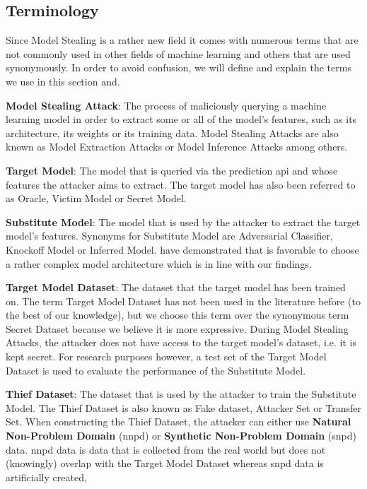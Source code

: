 \subsection{Terminology}
\label{sec:ModelStealing:Terminology}
Since Model Stealing is a rather new field it comes with numerous terms that are not commonly used in other fields of machine learning and others that are used 
synonymously. In order to avoid confusion, we will define and explain the terms we use in this section and. \par
\textbf{Model Stealing Attack}: The process of maliciously querying a machine learning model in order to extract some or all of the model's features, such as its
architecture, its weights or its training data. Model Stealing Attacks are also known as Model Extraction Attacks or Model Inference Attacks among others. \par
\textbf{Target Model}: The model that is queried via the prediction \gls{api} and whose features the attacker aims to extract. The target model has also been referred to 
as Oracle, Victim Model or Secret Model. \par
\textbf{Substitute Model}: The model that is used by the attacker to extract the target model's features. Synonyms for Substitute Model are Adversarial Classifier,
Knockoff Model or Inferred Model. \cite{orekondy2019knockoff} have demonstrated that is favorable to choose a rather complex model architecture which is in line with 
our findings.\par
\textbf{Target Model Dataset}: The dataset that the target model has been trained on. The term Target Model Dataset has not been used in the literature before (to 
the best of our knowledge), but we choose this term over the synonymous term Secret Dataset because we believe it is more expressive. During Model Stealing Attacks,
the attacker does not have access to the target model's dataset, i.e. it is kept secret. For research purposes however, a test set of the Target Model Dataset is
used to evaluate the performance of the Substitute Model. \par
\textbf{Thief Dataset}: The dataset that is used by the attacker to train the Substitute Model. The Thief Dataset is also known as Fake dataset, Attacker Set or 
Transfer Set. When constructing the Thief Dataset, the attacker can either use \textbf{Natural Non-Problem Domain} (\gls{nnpd}) or \textbf{Synthetic Non-Problem Domain} (\gls{snpd})
data. \gls{nnpd} data is data that is collected from the real world but does not (knowingly) overlap with the Target Model Dataset whereas \gls{snpd} data is artificially created,
